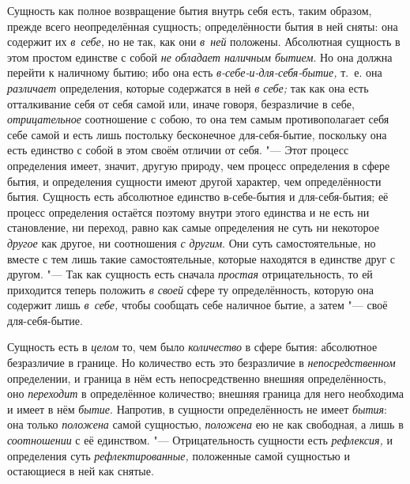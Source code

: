 Сущность как полное возвращение бытия внутрь себя есть, таким образом,
прежде всего неопределённая сущность; определённости бытия в ней сняты: она
содержит их {\em в~себе,} но не так, как они
{\em в~ней} положены. Абсолютная сущность в этом
простом единстве с собой {\em не обладает наличным
бытием}. Но она должна перейти к наличному бытию; ибо она есть
{\em в-себе-и-для-себя-бытие,} т.~е. она
{\em различает} определения, которые содержатся в ней
{\em в себе;} так как она есть отталкивание себя от
себя самой или, иначе говоря, безразличие в себе,
{\em отрицательное} соотношение с собою, то она тем
самым противополагает себя себе самой и есть лишь постольку бесконечное
для-себя-бытие, поскольку она есть единство с собой в этом своём отличии от
себя. "--- Этот процесс определения имеет, значит, другую природу, чем процесс
определения в сфере бытия, и определения сущности имеют другой характер,
чем определённости бытия. Сущность есть абсолютное единство в-себе-бытия и
для-себя-бытия; её процесс определения остаётся поэтому внутри этого
единства и не есть ни становление, ни переход, равно как самые определения
не суть ни некоторое {\em другое} как другое, ни
соотношения {\em с другим}. Они суть самостоятельные,
но вместе с тем лишь такие самостоятельные, которые находятся в единстве
друг с другом. "--- Так как сущность есть сначала
{\em простая} отрицательность, то ей приходится теперь
положить {\em в своей} сфере ту определённость, которую
она содержит лишь {\em в~себе,} чтобы сообщать себе
наличное бытие, а затем "--- своё для-себя-бытие.

Сущность есть в {\em целом} то, чем было
{\em количество} в сфере бытия: абсолютное безразличие
в границе. Но количество есть это безразличие в
{\em непосредственном} определении, и граница в нём
есть непосредственно внешняя определённость, оно
{\em переходит} в определённое количество; внешняя
граница для него необходима и имеет в нём {\em бытие}.
Напротив, в сущности определённость не имеет
{\em бытия}: она только
{\em положена} самой сущностью,
{\em положена} ею не как свободная, а лишь в
{\em соотношении} с её единством. "--- Отрицательность
сущности есть {\em рефлексия,} и определения суть
{\em рефлектированные,} положенные самой сущностью и
остающиеся в ней как снятые.

